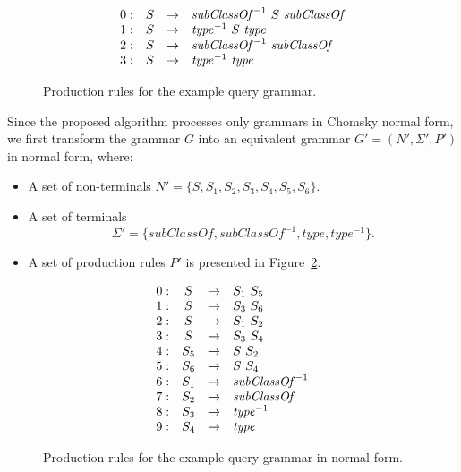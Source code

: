 \documentclass[runningheads,a4paper]{llncs}
\begin{document}
\begin{figure}[h]
	\[
	\begin{array}{rccl}
	0: & S & \rightarrow & \text{\textit{subClassOf}}^{-1} \ S \ \text{\textit{subClassOf}} \\ 
	1: & S & \rightarrow & \text{\textit{type}}^{-1} \ S \ \text{\textit{type}} \\ 
	2: & S & \rightarrow & \text{\textit{subClassOf}}^{-1} \ \text{\textit{subClassOf}} \\ 
	3: & S & \rightarrow & \text{\textit{type}}^{-1} \ \text{\textit{type}} \\ 
	\end{array}
	\]
	\caption{Production rules for the example query grammar.}
	\label{ProductionRulesExampleQuery}
\end{figure}

Since the proposed algorithm processes only grammars in Chomsky normal form, we first transform the grammar $G$ into an equivalent grammar $G' = (N', \Sigma', P')$ in normal form, where:
\begin{itemize}
	\item A set of non-terminals $N' = \{S, S_1, S_2, S_3, S_4, S_5, S_6\}$.
	\item A set of terminals $$\Sigma' = \{subClassOf, subClassOf^{-1}, type, type^{-1}\}.$$
	\item A set of production rules $P'$ is presented in Figure~\ref{ProductionRulesExampleQueryCNF}.
\end{itemize}

\begin{figure}[h]
	\[
	\begin{array}{rccl}
	0: & S & \rightarrow & S_1 \ S_5 \\
	1: & S & \rightarrow & S_3 \ S_6 \\
	2: & S & \rightarrow & S_1 \ S_2 \\
	3: & S & \rightarrow & S_3 \ S_4 \\
	4: & S_5 & \rightarrow & S \ S_2 \\
	5: & S_6 & \rightarrow & S \ S_4 \\
	6: & S_1 & \rightarrow & \text{\textit{subClassOf}}^{-1} \\ 
	7: & S_2 & \rightarrow & \text{\textit{subClassOf}} \\ 
	8: & S_3 & \rightarrow & \text{\textit{type}}^{-1} \\
	9: & S_4 & \rightarrow & \text{\textit{type}} \\ 
	\end{array}
	\]
	\caption{Production rules for the example query grammar in normal form.}
	\label{ProductionRulesExampleQueryCNF}
\end{figure}
\end{document}
